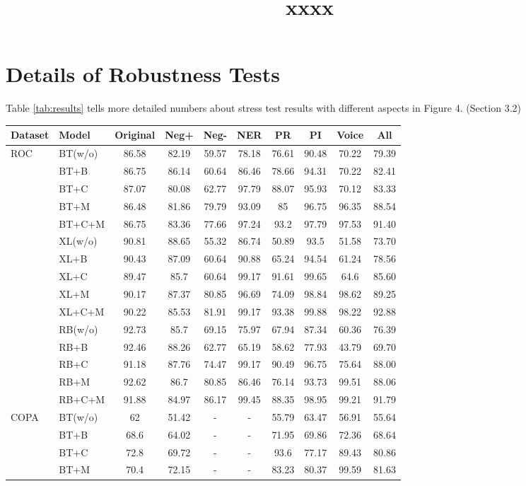 \documentclass[11pt,a4paper]{article}
\title{xxxx}
\author{}
\date{}
\newcommand{\tabref}[1]{Table \ref{#1}}
\begin{document}
\appendix
\section{Details of Robustness Tests}
\tabref{tab:results} tells more detailed numbers about 
stress test results with different aspects in Figure 4. (Section 3.2)


\begin{table}[th]
\scriptsize
\centering
\begin{tabular}{ll|c|ccccccc}\hline
\toprule  
\textbf{Dataset}&\textbf{Model}&\textbf{Original} &\textbf{Neg+} & \textbf{Neg-} &\textbf{NER} &\textbf{PR} &\textbf{PI}&\textbf{Voice}&\textbf{All}
                                               \\ 
 \hline
 \multirow{15}{*}{ROC} 
&BT(w/o)&86.58&82.19&59.57&78.18&76.61&90.48&70.22&79.39 \\
&BT+B&86.75&86.14&60.64&86.46&78.66&94.31&70.22&82.41 \\
&BT+C&87.07&80.08&62.77&97.79&88.07&95.93&70.12&83.33 \\
&BT+M&86.48&81.86&79.79&93.09&85&96.75&96.35&88.54 \\
&BT+C+M&86.75&83.36&77.66&97.24&93.2&97.79&97.53&91.40 \\
\cline{2-10}
&XL(w/o)&90.81&88.65&55.32&86.74&50.89&93.5&51.58&73.70 \\
&XL+B&90.43&87.09&60.64&90.88&65.24&94.54&61.24&78.56 \\
&XL+C&89.47&85.7&60.64&99.17&91.61&99.65&64.6&85.60 \\
&XL+M&90.17&87.37&80.85&96.69&74.09&98.84&98.62&89.25 \\
&XL+C+M&90.22&85.53&81.91&99.17&93.38&99.88&98.22&92.88 \\
\cline{2-10}
&RB(w/o)&92.73&85.7&69.15&75.97&67.94&87.34&60.36&76.39 \\
&RB+B&92.46&88.26&62.77&65.19&58.62&77.93&43.79&69.70 \\
&RB+C&91.18&87.76&74.47&99.17&90.49&96.75&75.64&88.00 \\
&RB+M&92.62&86.7&80.85&86.46&76.14&93.73&99.51&88.06 \\
&RB+C+M&91.88&84.97&86.17&99.45&88.35&98.95&99.21&91.79 \\
\hline
\multirow{15}{*}{COPA} 
&BT(w/o)&62&51.42&-&-&55.79&63.47&56.91&55.64 \\
&BT+B&68.6&64.02&-&-&71.95&69.86&72.36&68.64 \\
&BT+C&72.8&69.72&-&-&93.6&77.17&89.43&80.86 \\
&BT+M&70.4&72.15&-&-&83.23&80.37&99.59&81.63 \\

\end{tabular}
\end{table}
\end{document}
